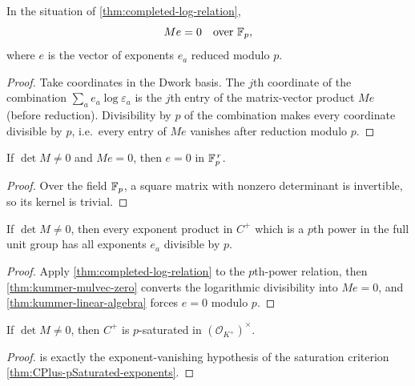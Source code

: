 \begin{theorem}\label{thm:kummer-mulvec-zero}
  \leanok
In the situation of \cref{thm:completed-log-relation},
\[
  M e=0
  \quad\text{over } \mathbb{F}_p,
\]
where $e$ is the vector of exponents $e_a$ reduced modulo $p$.
\end{theorem}
\begin{proof}\leanok
Take coordinates in the Dwork basis.  The $j$th coordinate of the
combination $\sum_a e_a \log\varepsilon_a$ is the $j$th entry of the
matrix-vector product $Me$ (before reduction).  Divisibility by $p$ of the
combination makes every coordinate divisible by $p$, i.e.\ every entry of
$Me$ vanishes after reduction modulo $p$.
\end{proof}

\begin{theorem}\label{thm:kummer-linear-algebra}
  \leanok
If $\det M\ne0$ and $Me=0$, then $e = 0$ in $\mathbb{F}_p^{\,r}$.
\end{theorem}
\begin{proof}\leanok
Over the field $\mathbb{F}_p$, a square matrix with nonzero determinant is
invertible, so its kernel is trivial.
\end{proof}

\begin{theorem}\label{thm:kummer-log-exponents-zero}
  \leanok
If $\det M \ne 0$, then every exponent product in $C^+$ which is a $p$th
power in the full unit group has all exponents $e_a$ divisible by $p$.
\end{theorem}
\begin{proof}\leanok
Apply \cref{thm:completed-log-relation} to the $p$th-power relation, then
\cref{thm:kummer-mulvec-zero} converts the logarithmic divisibility into
$Me=0$, and \cref{thm:kummer-linear-algebra} forces $e=0$ modulo $p$.
\end{proof}

\begin{theorem}\label{thm:kummer-log-det-saturation}
  \leanok
If $\det M \ne 0$, then $C^+$ is $p$-saturated in
$(\mathcal O_{K^+})^\times$.
\end{theorem}
\begin{proof}\leanok
{} is exactly the exponent-vanishing
hypothesis of the saturation criterion
\cref{thm:CPlus-pSaturated-exponents}.
\end{proof}

